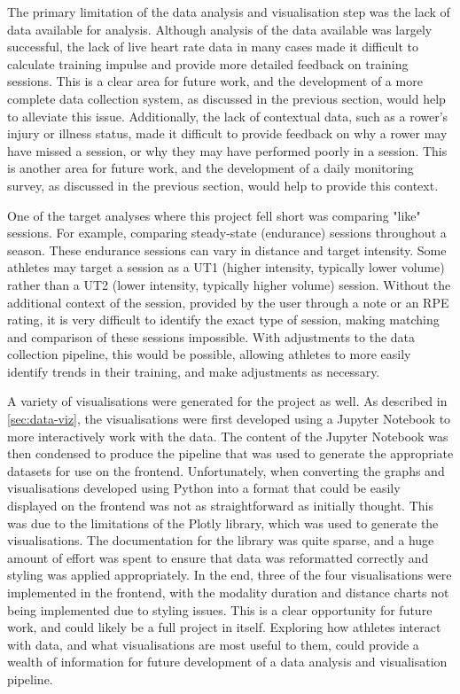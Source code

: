 The primary limitation of the data analysis and visualisation step was the lack of data available for analysis. Although analysis of the data available was largely successful, the lack of live heart rate data in many cases made it difficult to calculate training impulse and provide more detailed feedback on training sessions. This is a clear area for future work, and the development of a more complete data collection system, as discussed in the previous section, would help to alleviate this issue. Additionally, the lack of contextual data, such as a rower's injury or illness status, made it difficult to provide feedback on why a rower may have missed a session, or why they may have performed poorly in a session. This is another area for future work, and the development of a daily monitoring survey, as discussed in the previous section, would help to provide this context. 

One of the target analyses where this project fell short was comparing "like" sessions. For example, comparing steady-state (endurance) sessions throughout a season. These endurance sessions can vary in distance and target intensity. Some athletes may target a session as a UT1 (higher intensity, typically lower volume) rather than a UT2 (lower intensity, typically higher volume) session. Without the additional context of the session, provided by the user through a note or an RPE rating, it is very difficult to identify the exact type of session, making matching and comparison of these sessions impossible. With adjustments to the data collection pipeline, this would be possible, allowing athletes to more easily identify trends in their training, and make adjustments as necessary.

A variety of visualisations were generated for the project as well. As described in \autoref{sec:data-viz}, the visualisations were first developed using a Jupyter Notebook to more interactively work with the data. The content of the Jupyter Notebook was then condensed to produce the pipeline that was used to generate the appropriate datasets for use on the frontend. Unfortunately, when converting the graphs and visualisations developed using Python into a format that could be easily displayed on the frontend was not as straightforward as initially thought. This was due to the limitations of the Plotly library, which was used to generate the visualisations. The documentation for the library was quite sparse, and a huge amount of effort was spent to ensure that data was reformatted correctly and styling was applied appropriately. In the end, three of the four visualisations were implemented in the frontend, with the modality duration and distance charts not being implemented due to styling issues. This is a clear opportunity for future work, and could likely be a full project in itself. Exploring how athletes interact with data, and what visualisations are most useful to them, could provide a wealth of information for future development of a data analysis and visualisation pipeline.

